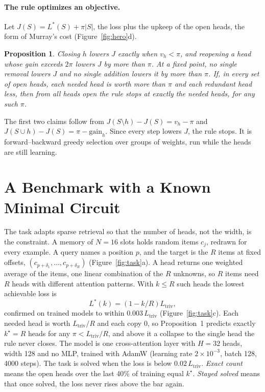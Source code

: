 \documentclass[letterpaper]{article} %
\newtheorem{proposition}{Proposition}
\newcommand{\Ltriv}{L_{\mathrm{triv}}}
\newcommand{\kstar}{k^\star}
\begin{document}
\paragraph{The rule optimizes an objective.} Let $J(S)=L^\ast(S)+\pi|S|$, the loss plus the upkeep of the open heads, the form of Murray's cost (Figure~\ref{fig:hero}d).
\begin{proposition}
Closing $h$ lowers $J$ exactly when $v_h<\pi$, and reopening a head whose gain exceeds $2\pi$ lowers $J$ by more than $\pi$. At a fixed point, no single removal lowers $J$ and no single addition lowers it by more than $\pi$. If, in every set of open heads, each needed head is worth more than $\pi$ and each redundant head less, then from all heads open the rule stops at exactly the needed heads, for any such $\pi$.
\end{proposition}
The first two claims follow from $J(S\setminus h)-J(S)=v_h-\pi$ and $J(S\cup h)-J(S)=\pi-\mathrm{gain}_h$. Since every step lowers $J$, the rule stops. It is forward--backward greedy selection \citep{pudil1994floating,zhang2011foba} over groups of weights, run while the heads are still learning.

\section{A Benchmark with a Known Minimal Circuit}

The task adapts sparse retrieval \citep{sanford2023representational} so that the number of heads, not the width, is the constraint. A memory of $N=16$ slots holds random items $c_j$, redrawn for every example. A query names a position $p$, and the target is the $R$ items at fixed offsets, $(c_{p+\delta_1},\dots,c_{p+\delta_R})$ (Figure~\ref{fig:task}a). A head returns one weighted average of the items, one linear combination of the $R$ unknowns, so $R$ items need $R$ heads with different attention patterns. With $k\le R$ such heads the lowest achievable loss is
\begin{equation}
L^\ast(k)=\left(1-k/R\right)\Ltriv ,
\label{eq:law}
\end{equation}
confirmed on trained models to within $0.003\,\Ltriv$ (Figure~\ref{fig:task}c). Each needed head is worth $\Ltriv/R$ and each copy $0$, so Proposition~1 predicts exactly $\kstar=R$ heads for any $\pi<\Ltriv/R$, and above it a collapse to the single head the rule never closes. The model is one cross-attention layer with $H=32$ heads, width 128 and no MLP, trained with AdamW (learning rate $2\times10^{-3}$, batch 128, 4000 steps). The task is solved when the loss is below $0.02\,\Ltriv$. \emph{Exact count} means the open heads over the last 40\% of training equal $\kstar$. \emph{Stayed solved} means that once solved, the loss never rises above the bar again.
\end{document}

